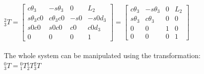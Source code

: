 \documentclass{article}
\begin{document}
${}^{2}_{3}T=
\begin{bmatrix}
c\theta_3 & -s\theta_3 & 0 & L_2\\
s\theta_3c0 & c\theta_3c0 & -s0 & -s0d_3\\
s0c0 & s0c0 & c0 & c0d_3\\
0 & 0 & 0 & 1
\end{bmatrix}=
\begin{bmatrix}
c\theta_3 & -s\theta_3 & 0 & L_2\\
s\theta_3 & c\theta_3 & 0 & 0\\
0 & 0 & 1 & 0\\
0 & 0 & 0 & 1
\end{bmatrix}$\\\\
The whole system can be manipulated using the transformation:\\
${}^{0}_{3}T={}^{0}_{1}T{}^{1}_{2}T{}^{2}_{3}T$ \newpage
\end{document}
